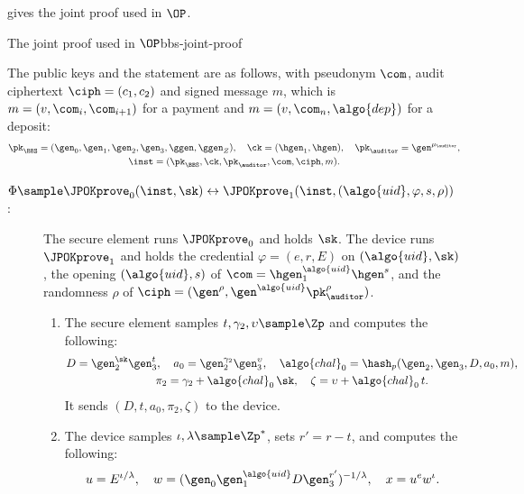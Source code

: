  gives the joint proof used in $\OP$.

\begin{protocolbox}{The joint proof used in $\OP$}{bbs-joint-proof}

  The public keys and the statement are as follows, with pseudonym $\com$,
audit ciphertext $\ciph = (c_1, c_2)$ and signed message $m$, which is $m = (v,
\com_i, \com_{i+1})$ for a payment and $m = (v, \com_n, \algo{dep})$ for a
deposit:
  \begin{gather*}
    \pk_\BBS = (\gen_0, \gen_1, \gen_2, \gen_3, \ggen, \ggen_Z), \quad \ck =
(\hgen_1, \hgen), \quad \pk_\auditor = \gen^{\mu_\auditor}, \\
    \inst = (\pk_\BBS, \ck, \pk_\auditor, \com, \ciph, m).
  \end{gather*}

  \begin{description}

    \item[$\Phi \sample \JPOKprove_0(\inst, \sk) \leftrightarrow
\JPOKprove_1(\inst, (\algo{uid}, \varphi, s, \rho))$ :] The secure element runs
$\JPOKprove_0$ and holds $\sk$. The device runs $\JPOKprove_1$ and holds the
credential
$\varphi = (e, r, E)$ on $(\algo{uid}, \sk)$, the opening $(\algo{uid}, s)$ of
$\com = \hgen_1^{\algo{uid}} \hgen^{s}$, and the randomness $\rho$ of $\ciph =
(\gen^{\rho}, \gen^{\algo{uid}} \pk_\auditor^{\rho})$.

      \begin{enumerate}

	\item The secure element samples $t, \gamma_2, \upsilon \sample \Zp$ and
computes the following:
          \begin{gather*}
            D = \gen_2^{\sk} \gen_3^{t}, \quad a_0 = \gen_2^{\gamma_2}
\gen_3^{\upsilon}, \quad \algo{chal}_0 = \hash_p(\gen_2, \gen_3, D, a_0, m), \\
            \pi_2 = \gamma_2 + \algo{chal}_0\, \sk, \quad \zeta = \upsilon +
\algo{chal}_0\, t.
          \end{gather*}
          It sends $(D, t, a_0, \pi_2, \zeta)$ to the device.

	\item The device samples $\iota, \lambda \sample \Zp^*$, sets $r' = r
- t$, and computes the following:
          \begin{equation*}
            u = E^{\iota/\lambda}, \quad w = (\gen_0 \gen_1^{\algo{uid}} D
\gen_3^{r'})^{-1/\lambda}, \quad x = u^{e} w^{\iota}.
          \end{equation*}


\end{enumerate}
\end{description}
\end{protocolbox}

